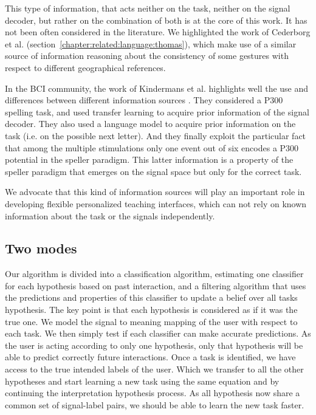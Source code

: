 This type of information, that acts neither on the task, neither on the signal decoder, but rather on the combination of both is at the core of this work. It has not been often considered in the literature. We highlighted the work of Cederborg et al. (section~\ref{chapter:related:language:thomas}), which make use of a similar source of information reasoning about the consistency of some gestures with respect to different geographical references.

In the BCI community, the work of Kindermans et al. highlights well the use and differences between different information sources \cite{kindermans2014integrating}. They considered a P300 spelling task, and used transfer learning to acquire prior information of the signal decoder. They also used a language model to acquire prior information on the task (i.e. on the possible next letter). And they finally exploit the particular fact that among the multiple stimulations only one event out of six encodes a P300 potential in the speller paradigm. This latter information is a property of the speller paradigm that emerges on the signal space but only for the correct task.

We advocate that this kind of information sources will play an important role in developing flexible personalized teaching interfaces, which can not rely on known information about the task or the signals independently.

\subsection{Two modes}

Our algorithm is divided into a classification algorithm, estimating one classifier for each hypothesis based on past interaction, and a filtering algorithm that uses the predictions and properties of this classifier to update a belief over all tasks hypothesis. The key point is that each hypothesis is considered as if it was the true one. We model the signal to meaning mapping of the user with respect to each task. We then simply test if each classifier can make accurate predictions. As the user is acting according to only one hypothesis, only that hypothesis will be able to predict correctly future interactions. Once a task is identified, we have access to the true intended labels of the user. Which we transfer to all the other hypotheses and start learning a new task using the same equation and by continuing the interpretation hypothesis process. As all hypothesis now share a common set of signal-label pairs, we should be able to learn the new task faster.

